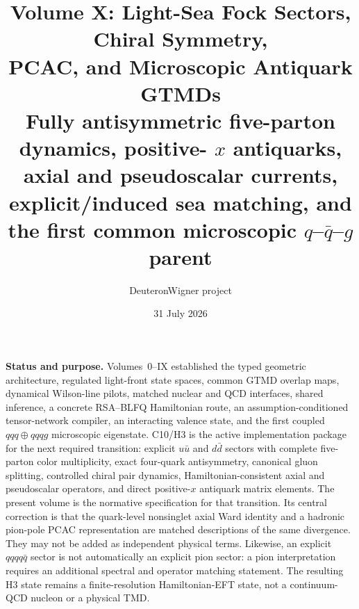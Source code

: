 \documentclass[11pt]{article}
\title{\vspace{-1.0cm}
{\color{navy}\bfseries Volume X: Light-Sea Fock Sectors, Chiral Symmetry,\\[2mm]
PCAC, and Microscopic Antiquark GTMDs}\\[4mm]
\large Fully antisymmetric five-parton dynamics, positive-
\(x\) antiquarks, axial and pseudoscalar currents, explicit/induced sea
matching, and the first common microscopic \(q\)--\(\bar q\)--\(g\) parent}
\author{DeuteronWigner project}
\date{31 July 2026}
\begin{document}
\maketitle

\begin{center}
\begin{minipage}{0.94\textwidth}
\colorbox{softblue}{\parbox{0.96\textwidth}{
\textbf{Status and purpose.}
Volumes~0--IX established the typed geometric architecture, regulated
light-front state spaces, common GTMD overlap maps, dynamical Wilson-line
pilots, matched nuclear and QCD interfaces, shared inference, a concrete
RSA--BLFQ Hamiltonian route, an assumption-conditioned tensor-network
compiler, an interacting valence state, and the first coupled
\(qqq\oplus qqqg\) microscopic eigenstate.  C10/H3 is the active
implementation package for the next required transition: explicit
\(u\bar u\) and \(d\bar d\) sectors with complete five-parton color
multiplicity, exact four-quark antisymmetry, canonical gluon splitting,
controlled chiral pair dynamics, Hamiltonian-consistent axial and
pseudoscalar operators, and direct positive-\(x\) antiquark matrix elements.
The present volume is the normative specification for that transition.  Its
central correction is that the quark-level nonsinglet axial Ward identity and
a hadronic pion-pole PCAC representation are matched descriptions of the same
divergence.  They may not be added as independent physical terms.  Likewise,
an explicit \(qqqq\bar q\) sector is not automatically an explicit pion
sector: a pion interpretation requires an additional spectral and operator
matching statement.  The resulting H3 state remains a finite-resolution
Hamiltonian-EFT state, not a continuum-QCD nucleon or a physical TMD.
}}
\end{minipage}
\end{center}
\end{document}

